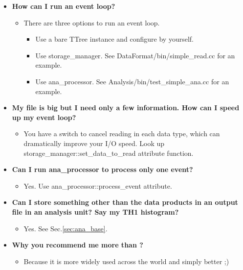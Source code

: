 \begin{itemize}
\item[] {\bf How can I run an event loop?}
  \begin{itemize}
    \item There are three options to run an event loop.
      \begin{itemize}
        \item Use a bare {\ttfamily TTree} instance and configure by yourself.
        \item Use {\ttfamily storage\_manager}. See DataFormat/bin/simple\_read.cc for an example.
        \item Use {\ttfamily ana\_processor}. See Analysis/bin/test\_simple\_ana.cc for an example.
      \end{itemize}
  \end{itemize}

\item[] {\bf My file is big but I need only a few information. How can I speed up my event loop?}
  \begin{itemize}
    \item You have a switch to cancel reading in each data type, which can dramatically improve your I/O speed. Look up {\ttfamily storage\_manager::set\_data\_to\_read} attribute function.
  \end{itemize}

\item[] {\bf Can I run {\ttfamily ana\_processor} to process only one event?}
  \begin{itemize}
    \item Yes. Use {\ttfamily ana\_processor::process\_event} attribute.
  \end{itemize}

\item[] {\bf Can I store something other than the data products in an output file in an analysis unit? Say my TH1 histogram?}
  \begin{itemize}
    \item Yes. See Sec.\ref{sec:ana_base}.
  \end{itemize}

\item[] {\bf Why you recommend me \PyROOT more than \CINT?}
  \begin{itemize}
    \item Because it is more widely used across the world and simply better ;)
  \end{itemize}

\end{itemize}
